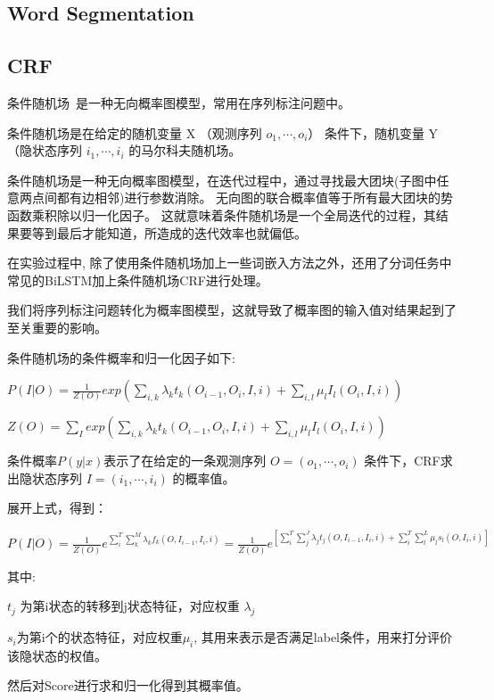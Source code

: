 \subsection{Word Segmentation}
\label{sec:cws}

\subsection*{CRF}

条件随机场~\cite{lafferty2001conditional}是一种无向概率图模型，常用在序列标注问题中。

条件随机场是在给定的随机变量 X （观测序列 $o_{1}, \cdots, o_{i}$） 条件下，随机变量 Y （隐状态序列 $i_{1}, \cdots, i_{i}$ 的马尔科夫随机场。

条件随机场是一种无向概率图模型，在迭代过程中，通过寻找最大团块(子图中任意两点间都有边相邻)进行参数消除。
无向图的联合概率值等于所有最大团块的势函数乘积除以归一化因子。
这就意味着条件随机场是一个全局迭代的过程，其结果要等到最后才能知道，所造成的迭代效率也就偏低。

在实验过程中, 除了使用条件随机场加上一些词嵌入方法之外，还用了分词任务中常见的BiLSTM加上条件随机场CRF进行处理。

我们将序列标注问题转化为概率图模型，这就导致了概率图的输入值对结果起到了至关重要的影响。

条件随机场的条件概率和归一化因子如下:

$P(I|O) = \frac{1}{Z(O)}exp( \sum_{i,k}^{}{\lambda_{k}}t_{k}(O_{i-1},O_{i},I,i)+\sum_{i,l}^{}{\mu_{l}}I_{l}(O_{i},I,i) )$

$Z(O)= \sum_{I}^{}{exp( \sum_{i,k}^{}{\lambda_{k}}t_{k}(O_{i-1},O_{i},I,i)+\sum_{i,l}^{}{\mu_{l}}I_{l}(O_{i},I,i) )}$

条件概率$P(y|x)$表示了在给定的一条观测序列 $O=(o_{1},\cdots, o_{i})$ 条件下，CRF求出隐状态序列 $I=(i_{1},\cdots, i_{i})$ 的概率值。

展开上式，得到：

$P(I | O)=\frac{1}{Z(O)} e^{\sum_{i}^{T}\sum_{k}^{M}\lambda_{k}f_{k}(O,I_{i-1},I_{i},i)}=\frac{1}{Z(O)} e^{ [ \sum_{i}^{T}\sum_{j}^{J}\lambda_{j}t_{j}(O,I_{i-1},I_{i},i) + \sum_{i}^{T}\sum_{l}^{L}\mu_{l}s_{l}(O,I_{i},i) ] }$


其中:

$t_{j}$ 为第i状态的转移到j状态特征，对应权重 $\lambda_{j}$

$s_i$为第i个的状态特征，对应权重$μ_i$, 其用来表示是否满足label条件，用来打分评价该隐状态的权值。

然后对Score进行求和归一化得到其概率值。

